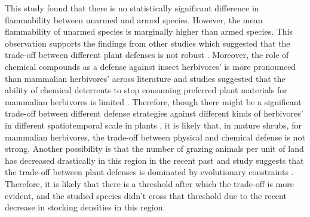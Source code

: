 \documentclass[12pt]{report}
\begin{document}
This study found that there is no statistically significant difference in flammability between unarmed and armed species. However, the mean flammability of unarmed species is marginally higher than armed species. This observation supports the findings from other studies which suggested that the trade-off between different plant defenses is not robust \citep{steward1988there, koricheva2004meta, moles2013correlations}. Moreover, the role of chemical compounds as a defense against insect herbivores' \citep{herms1992dilemma, ohgushi2005indirect} is more pronounced than mammalian herbivores' across literature and
studies suggested that the ability of chemical deterrents to stop consuming preferred plant materials for mammalian herbivores is limited \citep{cooper1985condensed, cooper1988foliage}. Therefore, though there might be a significant trade-off between different defense strategies against different kinds of herbivores' in different spatiotemporal scale  in plants \citep{eck2001trade, wigley2015mammal, dostalek2016trade}, it is likely that, in mature shrubs, for mammalian herbivores, the trade-off between physical and chemical defense is not strong. Another possibility is that the number of grazing animals per unit of land has decreased drastically in this region in the recent past \citep{wilcox2012historicalgrazing2} and study suggests that  the trade-off between plant defenses is dominated by evolutionary constraints \citep{eichenberg2015trade}.  Therefore, it is likely that there is a threshold after which the
trade-off is more evident, and the studied species didn’t cross that threshold due to
the recent decrease in stocking densities in this region.\\




\end{document}
